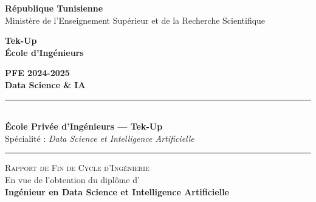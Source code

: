 
\begin{titlepage}
\thispagestyle{empty}
\begin{center}

{\footnotesize\textbf{République Tunisienne}}\\[2pt]
{\footnotesize Ministère de l'Enseignement Supérieur et de la Recherche Scientifique}\\[12pt]

\begin{minipage}[c]{0.45\textwidth}
  \centering
  \begin{tcolorbox}[enhanced, colback=farmblue!10, colframe=farmblue,
    arc=6pt, boxrule=1pt, width=3.5cm, height=2cm, valign=center, halign=center]
    {\small\bfseries\color{farmblue} Tek-Up\\École d'Ingénieurs}
  \end{tcolorbox}
\end{minipage}%
\begin{minipage}[c]{0.45\textwidth}
  \centering
  \begin{tcolorbox}[enhanced, colback=farmgreen!10, colframe=farmgreen,
    arc=6pt, boxrule=1pt, width=3.5cm, height=2cm, valign=center, halign=center]
    {\small\bfseries\color{farmgreen} PFE 2024-2025\\Data Science \& IA}
  \end{tcolorbox}
\end{minipage}

\vspace{0.4cm}
\rule{\textwidth}{1.5pt}\\[4pt]
{\large\textbf{École Privée d'Ingénieurs — Tek-Up}}\\
{\normalsize Spécialité : \textit{Data Science et Intelligence Artificielle}}\\[4pt]
\rule{\textwidth}{1.5pt}

\vspace{0.8cm}
{\large\textsc{Rapport de Fin de Cycle d'Ingénierie}}\\[6pt]
{\normalsize En vue de l'obtention du diplôme d'\\[2pt]
\textbf{Ingénieur en Data Science et Intelligence Artificielle}}


\end{center}
\end{titlepage}
